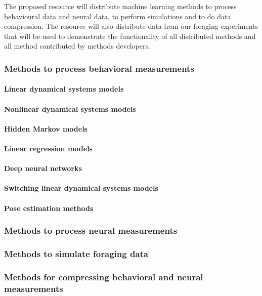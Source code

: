 The proposed resource will distribute machine learning methods to process
behavioural data and neural data, to perform simulations and to do data
compression. The resource will also distribute data from our foraging
experiments that will be used to demonstrate the functionality of all
distributed methods and all method contributed by methods developers.

\subsubsection*{Methods to process behavioral measurements}

\paragraph{Linear dynamical systems models}

\paragraph{Nonlinear dynamical systems models}

\paragraph{Hidden Markov models}

\paragraph{Linear regression models}

\paragraph{Deep neural networks}

\paragraph{Switching linear dynamical systems models}

\paragraph{Pose estimation methods}


\subsubsection*{Methods to process neural measurements}

\subsubsection*{Methods to simulate foraging data}

\subsubsection*{Methods for compressing behavioral and neural measurements}

